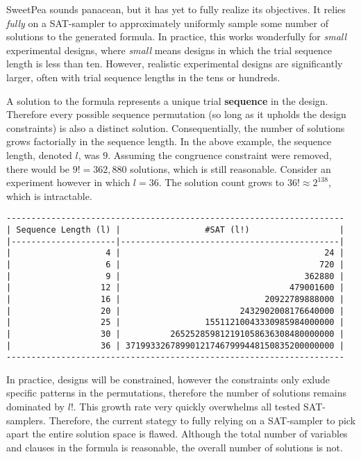 SweetPea sounds panacean, but it has yet to fully realize its objectives. It relies \textit{fully} on a SAT-sampler to approximately uniformly sample some number of solutions to the generated formula. In practice, this works wonderfully for \textit{small} experimental designs, where \textit{small} means designs in which the trial sequence length is less than ten. However, realistic experimental designs are significantly larger, often with trial sequence lengths in the tens or hundreds.

A solution to the formula represents a unique trial \textbf{sequence} in the design. Therefore every possible sequence permutation (so long as it upholds the design constraints) is also a distinct solution. Consequentially, the number of solutions grows factorially in the sequence length. In the above example, the sequence length, denoted $l$, was $9$. Assuming the congruence constraint were removed, there would be $9! = 362,880$ solutions, which is still reasonable. Consider an experiment however in which $l = 36$. The solution count grows to $36! \approx 2^{138}$, which is intractable.

\begin{verbatim}
--------------------------------------------------------------------
| Sequence Length (l) |                 #SAT (l!)                  |
|---------------------|--------------------------------------------|
|                   4 |                                         24 |
|                   6 |                                        720 |
|                   9 |                                     362880 |
|                  12 |                                  479001600 |
|                  16 |                             20922789888000 |
|                  20 |                        2432902008176640000 |
|                  25 |                 15511210043330985984000000 |
|                  30 |          265252859812191058636308480000000 |
|                  36 | 371993326789901217467999448150835200000000 |
--------------------------------------------------------------------
\end{verbatim}

In practice, designs will be constrained, however the constraints only exlude specific patterns in the permutations, therefore the number of solutions remains dominated by $l!$. This growth rate very quickly overwhelms all tested SAT-samplers. Therefore, the current stategy to fully relying on a SAT-sampler to pick apart the entire solution space is flawed. Although the total number of variables and clauses in the formula is reasonable, the overall number of solutions is not.
